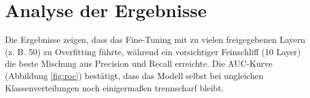\section{Analyse der Ergebnisse}
Die Ergebnisse zeigen, dass das Fine-Tuning mit zu vielen freigegebenen Layern (z. B. 50) zu Overfitting führte, während ein vorsichtiger Feinschliff (10 Layer) die beste Mischung aus Precision und Recall erreichte. Die AUC-Kurve (Abbildung \ref{fig:roc}) bestätigt, dass das Modell selbst bei ungleichen Klassenverteilungen noch einigermaßen trennscharf bleibt.


